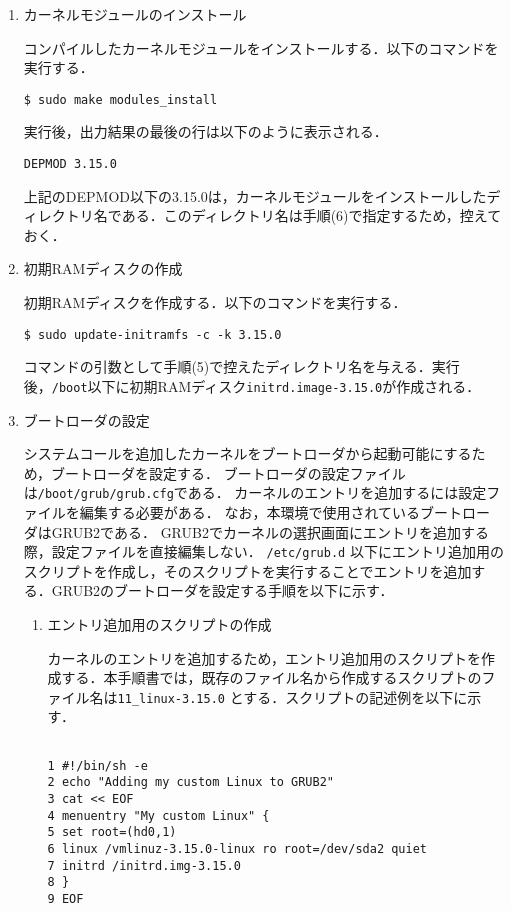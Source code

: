 \documentclass[12pt]{jsarticle}
\begin{document}
\begin{enumerate}
\item カーネルモジュールのインストール

コンパイルしたカーネルモジュールをインストールする．以下のコマンドを実行する．
\begin{verbatim}
$ sudo make modules_install
\end{verbatim}
実行後，出力結果の最後の行は以下のように表示される．
\begin{verbatim}
DEPMOD 3.15.0
\end{verbatim}
上記のDEPMOD以下の3.15.0は，カーネルモジュールをインストールしたディレクトリ名である．このディレクトリ名は手順(6)で指定するため，控えておく．

\item 初期RAMディスクの作成

初期RAMディスクを作成する．以下のコマンドを実行する．
\begin{verbatim}
$ sudo update-initramfs -c -k 3.15.0
\end{verbatim}
コマンドの引数として手順(5)で控えたディレクトリ名を与える．実行後，\verb|/boot|以下に初期RAMディスク\verb|initrd.image-3.15.0|が作成される．

\item ブートローダの設定

システムコールを追加したカーネルをブートローダから起動可能にするため，ブートローダを設定する．
ブートローダの設定ファイルは\verb|/boot/grub/grub.cfg|である．
カーネルのエントリを追加するには設定ファイルを編集する必要がある．
なお，本環境で使用されているブートローダはGRUB2である．
GRUB2でカーネルの選択画面にエントリを追加する際，設定ファイルを直接編集しない． \verb|/etc/grub.d| 以下にエントリ追加用のスクリプトを作成し，そのスクリプトを実行することでエントリを追加する．GRUB2のブートローダを設定する手順を以下に示す．


\begin{enumerate}
\item エントリ追加用のスクリプトの作成

カーネルのエントリを追加するため，エントリ追加用のスクリプトを作成する．本手順書では，既存のファイル名から作成するスクリプトのファイル名は\verb|11_linux-3.15.0| とする．スクリプトの記述例を以下に示す．
\begin{spacing}{0.7}
\begin{verbatim}

1 #!/bin/sh -e
2 echo "Adding my custom Linux to GRUB2"
3 cat << EOF
4 menuentry "My custom Linux" {
5 set root=(hd0,1)
6 linux /vmlinuz-3.15.0-linux ro root=/dev/sda2 quiet
7 initrd /initrd.img-3.15.0
8 }
9 EOF


\end{verbatim}
\end{spacing}
\end{enumerate}
\end{enumerate}
\end{document}

